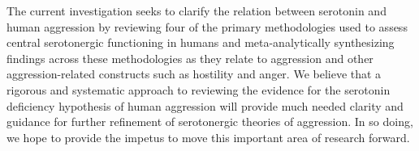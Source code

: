 
 

The current investigation seeks to clarify the relation between serotonin and human aggression by
reviewing four of the primary methodologies used to assess
central serotonergic functioning in humans and meta-analytically synthesizing 
findings across these methodologies as they relate to 
aggression and other aggression-related constructs such as hostility and anger.
We believe that a rigorous and systematic approach to reviewing the evidence for
the serotonin deficiency hypothesis of human
aggression will provide much needed clarity and guidance for further refinement 
of serotonergic theories of aggression.
In so doing, we hope to provide the impetus to move this important area of research forward.







